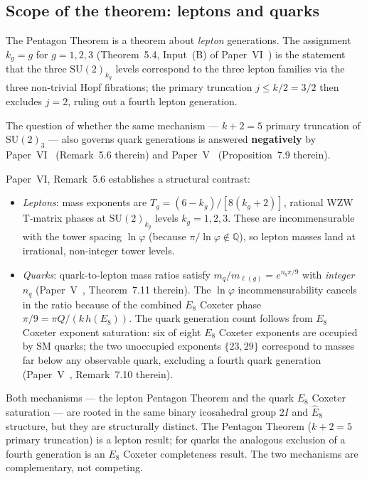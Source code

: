 \documentclass[11pt,a4paper]{article}
\theoremstyle{definition}
\theoremstyle{remark}
\newcommand{\vp}{\varphi}
\newcommand{\twoI}{2I}
\newcommand{\Ehat}{\hat{E}_8}
\begin{document}
\subsection{Scope of the theorem: leptons and quarks}
\label{F:sec:scope}

The Pentagon Theorem is a theorem about \emph{lepton} generations.
The assignment $k_g = g$ for $g=1,2,3$ (Theorem~5.4,
Input~(B) of Paper~VI~\cite{Paper6}) is the statement that the three
$\mathrm{SU}(2)_{k_g}$ levels correspond to the three lepton families via the
three non-trivial Hopf fibrations; the primary truncation $j\leq k/2=3/2$
then excludes $j=2$, ruling out a fourth lepton generation.

The question of whether the same mechanism --- $k+2=5$ primary truncation
of $\mathrm{SU}(2)_3$ --- also governs quark generations is answered
\textbf{negatively} by Paper~VI~\cite{Paper6}
(Remark~5.6 therein) and Paper~V~\cite{Paper5}
(Proposition~7.9 therein).

Paper~VI, Remark~5.6 establishes a structural contrast:
\begin{itemize}
\item \emph{Leptons}: mass exponents are
  $T_g = (6-k_g)/[8(k_g+2)]$, rational WZW T-matrix phases at
  $\mathrm{SU}(2)_{k_g}$ levels $k_g=1,2,3$.
  These are incommensurable with the tower spacing $\ln\vp$
  (because $\pi/\ln\vp\notin\mathbb{Q}$), so lepton masses land at
  irrational, non-integer tower levels.
\item \emph{Quarks}: quark-to-lepton mass ratios satisfy
  $m_q/m_{\ell(g)} = e^{n_q\pi/9}$ with \emph{integer} $n_q$
  (Paper~V~\cite{Paper5}, Theorem~7.11 therein).
  The $\ln\vp$ incommensurability cancels in the ratio because of the
  combined $E_8$ Coxeter phase $\pi/9 = \pi Q/(k\,h(E_8))$.
  The quark generation count follows from $E_8$ Coxeter exponent
  saturation: six of eight $E_8$ Coxeter exponents are occupied
  by SM quarks; the two unoccupied exponents $\{23,29\}$ correspond to
  masses far below any observable quark, excluding a fourth
  quark generation (Paper~V~\cite{Paper5}, Remark~7.10 therein).
\end{itemize}

Both mechanisms --- the lepton Pentagon Theorem and the quark $E_8$ Coxeter
saturation --- are rooted in the same binary icosahedral group $\twoI$ and
$\Ehat$ structure, but they are structurally distinct.
The Pentagon Theorem ($k+2=5$ primary truncation) is a lepton result;
for quarks the analogous exclusion of a fourth generation is an $E_8$
Coxeter completeness result.
The two mechanisms are complementary, not competing.
\end{document}
